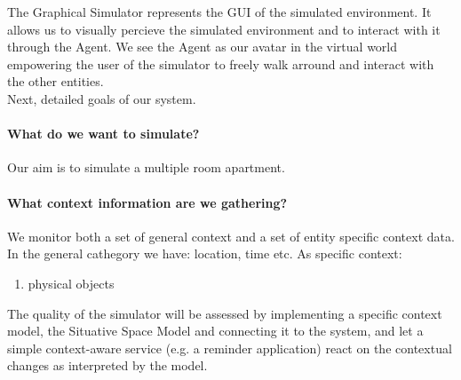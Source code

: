 The Graphical Simulator represents the GUI of the simulated environment. It allows us to visually percieve the simulated environment and to interact with it through the Agent. We see the Agent as our avatar in the virtual world empowering the user of the simulator to freely walk arround and interact with the other entities.\\

Next, detailed goals of our system.

\paragraph{What do we want to simulate?} Our aim is to simulate a multiple room apartment.

\paragraph{What context information are we gathering?} We monitor both a set of general context and a set of entity specific context data. In the general cathegory we have: location, time etc. As specific context:
\begin{enumerate}
	\item physical objects 
\end{enumerate}

The quality of the simulator will be assessed by implementing a specific context model, the Situative Space Model \cite{pederson2011situative} and connecting it to the system, and let a simple context-aware service (e.g. a reminder application) react on the contextual changes as interpreted by the model. \\









